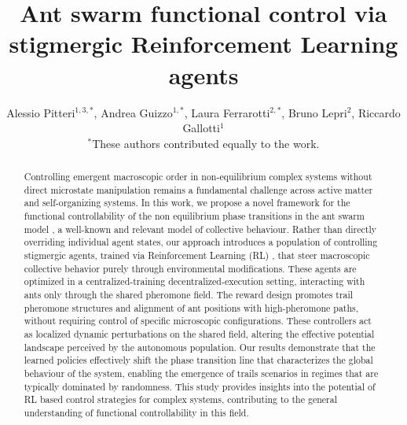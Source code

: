 \documentclass[openacc]{rsproca_new}
\begin{document}
\title{Ant swarm functional control via stigmergic Reinforcement Learning agents}
\author{
Alessio Pitteri$^{1,3,*}$,
Andrea Guizzo$^{1,*}$,
Laura Ferrarotti$^{2,*}$,
Bruno Lepri$^{2}$,
Riccardo Gallotti$^{1}$\\[0.5em]
\small $^{*}$These authors contributed equally to the work.
}

\address{$^{1}$MobS Lab, Fondazione Bruno Kessler, Via Sommarive, 18, Trento, 38123, Italy\\
$^{2}$CHuB Lab, Fondazione Bruno Kessler, Via Sommarive, 18, Trento, 38123, Italy\\
$^{3}$City Science Lab, Alma Mater Studiorum Università di Bologna, Viale Carlo Berti Pichat, 6/2, Bologna, 40127, Italy }

\subject{xxxxx, xxxxx, xxxx}






\begin{abstract}
Controlling emergent macroscopic order in non-equilibrium complex systems without direct microstate manipulation remains a fundamental challenge across active matter and self-organizing systems. 
In this work, we propose a novel framework for the functional controllability of the non equilibrium phase transitions in the ant swarm model \cite{chialvoswarms,patternformation,SwarmPhaseTrans}, a well-known and relevant model of collective behaviour. Rather than directly overriding individual agent states, our approach introduces a population of controlling stigmergic agents, trained via Reinforcement Learning (RL) \cite{suttonbarto}, that steer macroscopic collective behavior purely through environmental modifications. These agents are optimized %
in a centralized-training decentralized-execution setting, interacting with ants only through the shared pheromone field. The reward design promotes trail pheromone structures and alignment of ant positions with high-pheromone paths, without requiring control of specific microscopic configurations. These controllers act as localized dynamic perturbations on the shared field, altering the effective potential landscape perceived by the autonomous population. Our results demonstrate that the learned policies effectively shift the phase transition line that characterizes the global behaviour of the system, enabling the emergence of trails scenarios in regimes that are typically dominated by randomness. This study provides insights into the potential of RL based control strategies for complex systems, contributing %
to the general understanding of functional controllability in this field. %
\end{abstract}
\end{document}
